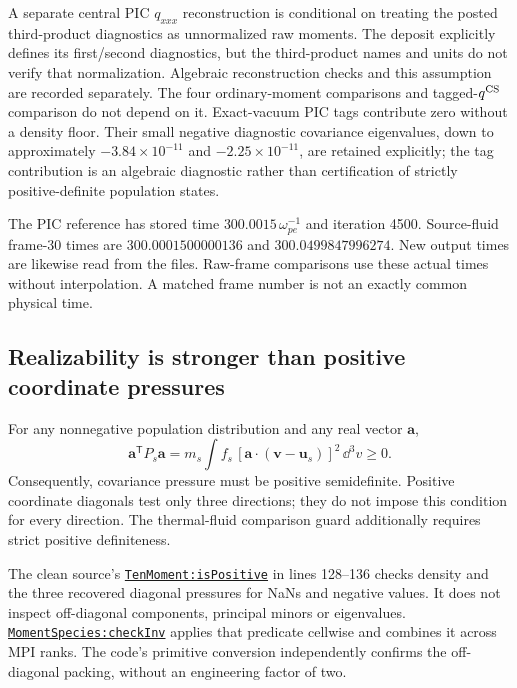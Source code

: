A separate central PIC $q_{xxx}$ reconstruction is conditional on treating
the posted third-product diagnostics as unnormalized raw moments. The
deposit explicitly defines its first/second diagnostics, but the third-product
names and units do not verify that normalization. Algebraic reconstruction
checks and this assumption are recorded separately. The four ordinary-moment
comparisons and tagged-$q^{\rm CS}$ comparison do not depend on it.
Exact-vacuum PIC tags contribute zero without a density floor. Their small
negative diagnostic covariance eigenvalues, down to approximately
$-3.84\times10^{-11}$ and $-2.25\times10^{-11}$, are retained explicitly;
the tag contribution is an algebraic diagnostic rather than certification
of strictly positive-definite population states.

The PIC reference has stored time $300.0015\,\omega_{pe}^{-1}$ and iteration
4500. Source-fluid frame-30 times are $300.0001500000136$ and
$300.0499847996274$. New output times are likewise read from the files.
Raw-frame comparisons use these actual times without interpolation. A
matched frame number is not an exactly common physical time.

\subsection{Realizability is stronger than positive coordinate pressures}
For any nonnegative population distribution and any real vector $\bm a$,
\[
 \bm a^{\mathsf T}P_s\bm a
 =m_s\int f_s\,[\bm a\!\cdot(\bm v-\bm u_s)]^2\,\dd^3v\ge0.
\]
Consequently, covariance pressure must be positive semidefinite. Positive
coordinate diagonals test only three directions; they do not impose this
condition for every direction. The thermal-fluid comparison guard additionally
requires strict positive definiteness.

The clean source's
\href{https://github.com/liangwang0734/gkyl/blob/9663ea594e80f68eb305378e14512db390440e6b/Eq/TenMoment.lua}{\texttt{TenMoment:isPositive}}
in lines 128--136 checks density and the three recovered diagonal pressures
for NaNs and negative values. It does not inspect off-diagonal components,
principal minors or eigenvalues.
\href{https://github.com/liangwang0734/gkyl/blob/9663ea594e80f68eb305378e14512db390440e6b/App/Species/MomentSpecies.lua}{\texttt{MomentSpecies:checkInv}}
applies that predicate cellwise and combines it across MPI ranks.
The code's primitive conversion independently confirms the off-diagonal
packing, without an engineering factor of two.

